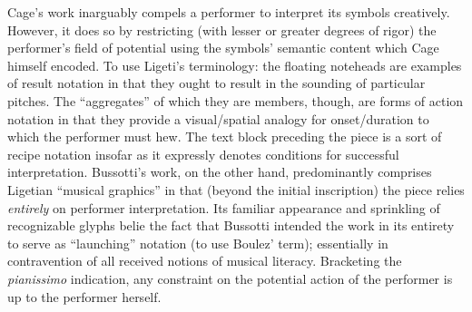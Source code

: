     Cage's work inarguably compels a performer to interpret its symbols creatively. However, it does so by restricting (with lesser or greater degrees of rigor) the performer's field of potential using the symbols' semantic content which Cage himself encoded. To use Ligeti's terminology: the floating noteheads are examples of result notation in that they ought to result in the sounding of particular pitches.  The ``aggregates'' of which they are members, though, are forms of action notation in that they provide a visual/spatial analogy for onset/duration to which the performer must hew. The text block preceding the piece is a sort of recipe notation insofar as it expressly denotes conditions for successful interpretation. Bussotti's work, on the other hand, predominantly comprises Ligetian ``musical graphics'' in that (beyond the initial inscription) the piece relies \textit{entirely} on performer interpretation. Its familiar appearance and sprinkling of recognizable glyphs belie the fact that Bussotti intended the work in its entirety to serve as ``launching'' notation (to use Boulez' term); essentially in contravention of all received notions of musical literacy. Bracketing the \textit{pianissimo} indication, any constraint on the potential action of the performer is up to the performer herself.
 
